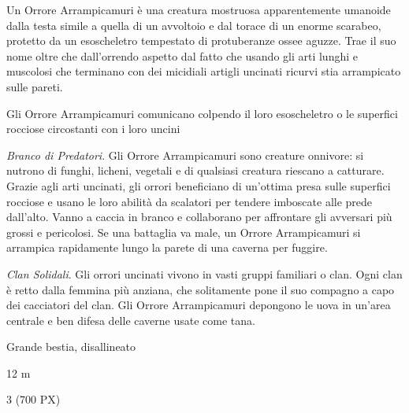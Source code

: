 \begin{multicols}{2}
{Un Orrore Arrampicamuri è una creatura mostruosa apparentemente umanoide dalla testa simile a quella di un avvoltoio e dal torace di un enorme scarabeo, protetto da un esoscheletro tempestato di protuberanze ossee aguzze. Trae il suo nome oltre che dall'orrendo aspetto dal fatto che usando gli arti lunghi e muscolosi che terminano con dei micidiali artigli uncinati ricurvi stia arrampicato sulle pareti.

Gli Orrore Arrampicamuri comunicano colpendo il loro esoscheletro o le superfici rocciose circostanti con i loro uncini

\emph{Branco di Predatori}. Gli Orrore Arrampicamuri sono creature onnivore: si nutrono di funghi, licheni, vegetali e di qualsiasi creatura riescano a catturare. Grazie agli arti uncinati, gli orrori beneficiano di un'ottima presa sulle superfici rocciose e usano le loro abilità da scalatori per tendere imboscate alle prede dall'alto. Vanno a caccia in branco e collaborano per affrontare gli avversari più grossi e pericolosi. Se una battaglia va male, un Orrore Arrampicamuri si arrampica rapidamente lungo la parete di una caverna per fuggire.

\emph{Clan Solidali}. Gli orrori uncinati vivono in vasti gruppi familiari o clan. Ogni clan è retto dalla femmina più anziana, che solitamente pone il suo compagno a capo dei cacciatori del clan. Gli Orrore Arrampicamuri depongono le uova in un'area centrale e ben difesa delle caverne usate come tana.

\begin{description}[noitemsep, topsep=0pt, parsep=0pt, partopsep=0pt, itemsep=1pt, leftmargin=2.35cm,  labelwidth=2.2cm, itemindent=0cm, listparindent=0pt] %
\setlength{\baselineskip}{10pt}
\item[\textbf{Taglia/Tipo}] Grande bestia, disallineato
\item[\textbf{Caratt.}] 
\item[\textbf{Punti Ferita}] 
\item[\textbf{Movimento}] 12 m
\item[\textbf{Tiri Salvez.}] 
\item[\textbf{Sensi}] 
\item[\textbf{Sfida}] 3 (700 PX)
\end{description}
\smallskip

}
\end{multicols}

